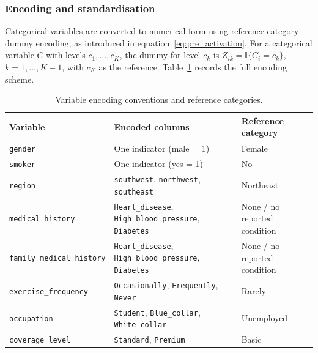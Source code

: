 
\subsubsection{Encoding and standardisation}
Categorical variables are converted to numerical form using
reference-category dummy encoding, as introduced in
equation~\eqref{eq:pre_activation}.  For a categorical variable $C$ with
levels $c_1,\dots,c_K$, the dummy for level $c_k$ is
$Z_{ik} = \mathbb{I}\{C_i = c_k\}$, $k=1,\dots,K{-}1$, with $c_K$ as the
reference.  Table~\ref{tab:encoding_conventions} records the full encoding
scheme.

\begin{table}[H]
\centering
\small
\renewcommand{\arraystretch}{1.15}
\begin{tabular}{p{}p{}p{}}
\toprule
\textbf{Variable} & \textbf{Encoded columns} & \textbf{Reference category} \\
\midrule
\texttt{gender} & One indicator (male = 1) & Female \\
\texttt{smoker} & One indicator (yes = 1) & No \\
\texttt{region} & \texttt{southwest}, \texttt{northwest}, \texttt{southeast} & Northeast \\
\texttt{medical\_\allowbreak{}history} & \texttt{Heart\_\allowbreak{}disease}, \texttt{High\_blood\_\allowbreak{}pressure}, \texttt{Diabetes} & None / no reported condition \\
\texttt{family\_medical\_\allowbreak{}history} & \texttt{Heart\_\allowbreak{}disease}, \texttt{High\_blood\_\allowbreak{}pressure}, \texttt{Diabetes} & None / no reported condition \\
\texttt{exercise\_\allowbreak{}frequency} & \texttt{Occasionally}, \texttt{Frequently}, \texttt{Never} & Rarely \\
\texttt{occupation} & \texttt{Student}, \texttt{Blue\_\allowbreak{}collar}, \texttt{White\_\allowbreak{}collar} & Unemployed \\
\texttt{coverage\_\allowbreak{}level} & \texttt{Standard}, \texttt{Premium} & Basic \\
\bottomrule
\end{tabular}
\caption{Variable encoding conventions and reference categories.}
\label{tab:encoding_conventions}
\end{table}

